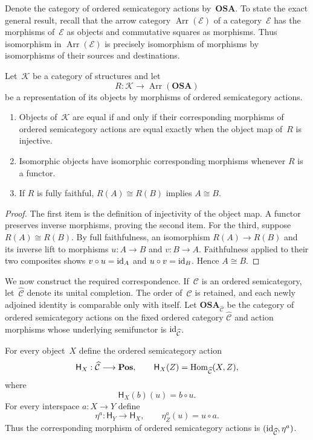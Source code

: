 Denote the category of ordered semicategory actions by~$\mathbf{OSA}$.
To state the exact general result, recall that the arrow category
$\operatorname{Arr}(\mathcal E)$ of a category~$\mathcal E$ has the
morphisms of~$\mathcal E$ as objects and commutative squares as morphisms.
Thus isomorphism in $\operatorname{Arr}(\mathcal E)$ is precisely
isomorphism of morphisms by isomorphisms of their sources and
destinations.

\begin{thm}\label{representation-by-osa-morphisms}
Let~$\mathcal K$ be a category of structures and let
\[
R:\mathcal K\longrightarrow
\operatorname{Arr}(\mathbf{OSA})
\]
be a representation of its objects by morphisms of ordered semicategory
actions.
\begin{enumerate}
\item Objects of~$\mathcal K$ are equal if and only if their corresponding
morphisms of ordered semicategory actions are equal exactly when the
object map of~$R$ is injective.
\item Isomorphic objects have isomorphic corresponding morphisms whenever
$R$ is a functor.
\item If $R$ is fully faithful, $R(A)\cong R(B)$ implies $A\cong B$.
\end{enumerate}
\end{thm}

\begin{proof}
The first item is the definition of injectivity of the object map. A
functor preserves inverse morphisms, proving the second item. For the
third, suppose $R(A)\cong R(B)$. By full faithfulness, an isomorphism
$R(A)\to R(B)$ and its inverse lift to morphisms $u:A\to B$ and
$v:B\to A$.  Faithfulness applied to their two composites shows
$v\circ u={\operatorname{id}}_A$ and $u\circ v={\operatorname{id}}_B$.  Hence $A\cong B$.
\end{proof}

We now construct the required correspondence.  If~$\mathcal C$ is an
ordered semicategory, let~$\widehat{\mathcal C}$ denote its unital
completion.  The order of~$\mathcal C$ is retained, and each newly adjoined
identity is comparable only with itself.  Let
$\mathbf{OSA}_{\widehat{\mathcal C}}$ be the category of ordered
semicategory actions on the fixed ordered category
$\widehat{\mathcal C}$ and action morphisms whose underlying semifunctor
is ${\operatorname{id}}_{\widehat{\mathcal C}}$.

For every object~$X$ define the ordered semicategory action
\[
\mathsf H_X:\widehat{\mathcal C}\longrightarrow\mathbf{Pos},
\qquad
\mathsf H_X(Z)=\operatorname{Hom}_{\widehat{\mathcal C}}(X,Z),
\]
where
\[
\mathsf H_X(b)(u)=b\circ u.
\]
For every interspace $a:X\to Y$ define
\[
\eta^a:\mathsf H_Y\longrightarrow\mathsf H_X,
\qquad
\eta^a_Z(u)=u\circ a.
\]
Thus the corresponding morphism of ordered semicategory actions is
$({\operatorname{id}}_{\widehat{\mathcal C}},\eta^a)$.

